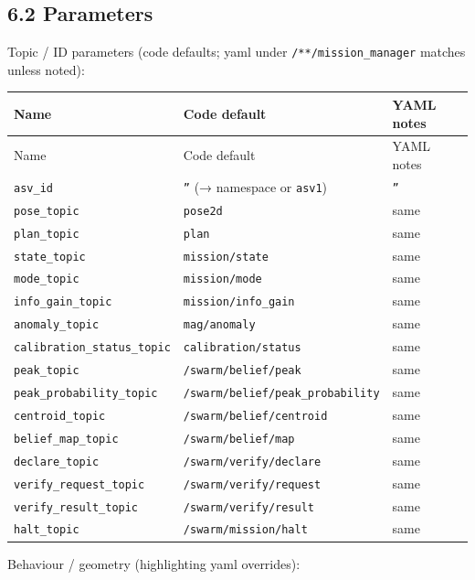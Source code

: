 \subsection{6.2 Parameters}


Topic / ID parameters (code defaults; yaml under \texttt{/**/mission\_manager} matches unless noted):


\begin{center}
\small
\begin{longtable}{@{}llp{7.2cm}@{}}
\toprule
Name & Code default & YAML notes \\
\midrule
\endfirsthead
\toprule
Name & Code default & YAML notes \\
\midrule
\endhead
\texttt{asv\_id} & \texttt{''} (→ namespace or \texttt{asv1}) & \texttt{''} \\
\texttt{pose\_topic} & \texttt{pose2d} & same \\
\texttt{plan\_topic} & \texttt{plan} & same \\
\texttt{state\_topic} & \texttt{mission/state} & same \\
\texttt{mode\_topic} & \texttt{mission/mode} & same \\
\texttt{info\_gain\_topic} & \texttt{mission/info\_gain} & same \\
\texttt{anomaly\_topic} & \texttt{mag/anomaly} & same \\
\texttt{calibration\_status\_topic} & \texttt{calibration/status} & same \\
\texttt{peak\_topic} & \texttt{/swarm/belief/peak} & same \\
\texttt{peak\_probability\_topic} & \texttt{/swarm/belief/peak\_probability} & same \\
\texttt{centroid\_topic} & \texttt{/swarm/belief/centroid} & same \\
\texttt{belief\_map\_topic} & \texttt{/swarm/belief/map} & same \\
\texttt{declare\_topic} & \texttt{/swarm/verify/declare} & same \\
\texttt{verify\_request\_topic} & \texttt{/swarm/verify/request} & same \\
\texttt{verify\_result\_topic} & \texttt{/swarm/verify/result} & same \\
\texttt{halt\_topic} & \texttt{/swarm/mission/halt} & same \\
\bottomrule
\end{longtable}
\end{center}


Behaviour / geometry (highlighting yaml overrides):


